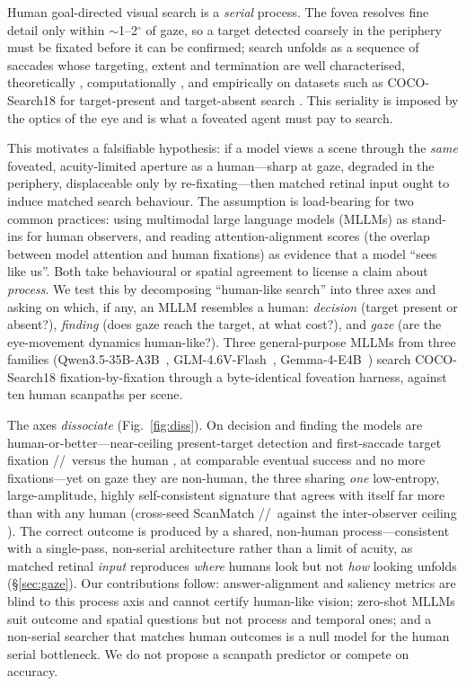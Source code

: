\documentclass[runningheads]{llncs}
\begin{document}
Human goal-directed visual search is a \emph{serial} process. The fovea resolves fine detail only within
$\sim$1--2$^{\circ}$ of gaze, so a target detected coarsely in the periphery must be fixated before it can
be confirmed; search unfolds as a sequence of saccades whose targeting, extent and termination are well
characterised, theoretically \cite{heaton2020serial,gupta2022asymmetry}, computationally
\cite{bujia2022bayes,travi2022bench,yang2020irl,yang2024hat}, and empirically on datasets such as
COCO-Search18 for target-present and target-absent search \cite{chen2021cocosearch18,chen2022targetabsent}.
This seriality is imposed by the optics of the eye and is what a foveated agent must pay to search.

This motivates a falsifiable hypothesis: if a model views a scene through the \emph{same} foveated,
acuity-limited aperture as a human---sharp at gaze, degraded in the periphery, displaceable only by
re-fixating---then matched retinal input ought to induce matched search behaviour. The assumption is
load-bearing for two common practices: using multimodal large language models (MLLMs) as stand-ins for
human observers, and reading attention-alignment scores (the overlap between model attention and human
fixations) as evidence that a model ``sees like us''. Both take behavioural or spatial agreement to
license a claim about \emph{process}. We test this by decomposing ``human-like search'' into three axes and
asking on which, if any, an MLLM resembles a human: \emph{decision} (target present or absent?),
\emph{finding} (does gaze reach the target, at what cost?), and \emph{gaze} (are the eye-movement dynamics
human-like?). Three general-purpose MLLMs from three families (Qwen3.5-35B-A3B~\cite{qwen3.5}, GLM-4.6V-Flash~\cite{vteam2025glm45vglm41vthinkingversatilemultimodal},
Gemma-4-E4B~\cite{gemmateam2026gemma4technicalreport}) search COCO-Search18 fixation-by-fixation through a byte-identical foveation harness, against
ten human scanpaths per scene.

The axes \emph{dissociate} (Fig.~\ref{fig:diss}). On decision and finding the models are
human-or-better---near-ceiling present-target detection and first-saccade target fixation
\QwenGPTFPone/\GlmGPTFPone/\GemmaGPTFPone\ versus the human \HumanTFPone, at comparable eventual success and
no more fixations---yet on gaze they are non-human, the three sharing \emph{one} low-entropy,
large-amplitude, highly self-consistent signature that agrees with itself far more than with any human
(cross-seed ScanMatch \QwenGPSelfConsist/\GlmGPSelfConsist/\GemmaGPSelfConsist\ against the inter-observer
ceiling \HumanCeiling). The correct outcome is produced by a shared, non-human process---consistent with a
single-pass, non-serial architecture rather than a limit of acuity, as matched retinal \emph{input}
reproduces \emph{where} humans look but not \emph{how} looking unfolds (\S\ref{sec:gaze}). Our contributions
follow: answer-alignment and saliency metrics are blind to this process axis and cannot certify human-like
vision; zero-shot MLLMs suit outcome and spatial questions but not process and temporal ones; and a
non-serial searcher that matches human outcomes is a null model for the human serial bottleneck. We do not
propose a scanpath predictor or compete on accuracy.
\end{document}
